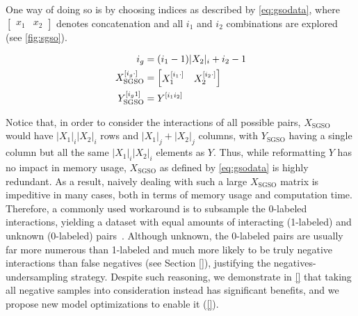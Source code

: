 One way of
doing so is by choosing indices as described by \autoref{eq:gsodata}, where
$\begin{bmatrix} x_1 & x_2\end{bmatrix}$ denotes concatenation and all $i_1$ and
$i_2$ combinations are explored (see \autoref{fig:sgso}).

%
\begin{equation}
    \begin{split}
    i_g &= (i_1-1)|X_2|_i+i_2-1\\
    X_\text{SGSO} ^{[i_g\cdot]} &= \begin{bmatrix} X_1 ^{[i_1\cdot]} & X_2^{[i_2\cdot]}\end{bmatrix}\\
    Y_\text{SGSO} ^{[i_g1]} &= Y^{[i_1i_2]}
    \end{split}
    \label{eq:gsodata}
\end{equation}

Notice that, in order to consider the interactions of all possible pairs, $X_\text{SGSO}$ would have $|X_1|_i|X_2|_i$ rows and $|X_1|_j+|X_2|_j$ columns, with $Y_\text{SGSO}$ having a single column but all the same $|X_1|_i|X_2|_i$ elements as $Y$. Thus, while reformatting $Y$ has no impact in memory usage, $X_\text{SGSO}$ as defined by \autoref{eq:gsodata} is highly redundant.
As a result, naively dealing with such a large $X_\text{SGSO}$ matrix is impeditive in many cases, both in terms of memory usage and computation time. Therefore, a commonly used workaround is to subsample the 0-labeled interactions, yielding a dataset with equal amounts of interacting (1-labeled) and unknown (0-labeled) pairs~\cite{}.
Although unknown, the 0-labeled pairs are usually far more numerous than 1-labeled and much more likely to be truly negative interactions than false negatives (see Section \ref{}), justifying the negatives-undersampling strategy. Despite such reasoning, we demonstrate in \autoref{} that taking all negative samples into consideration instead has significant benefits, and we propose new model optimizations to enable it (\autoref{}).

